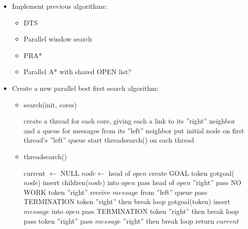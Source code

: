 \documentclass{article}
\begin{document}
\begin{itemize}


\item Implement previous algorithms:
  \begin{itemize}
  \item DTS
  \item Parallel window search
  \item PRA*
  \item Parallel A* with shared OPEN list?
  \end{itemize}

\item Create a new parallel best first search algorithm:\\
  \begin{itemize}
  \item search(init, cores)
  \begin{algorithmic}[1]
  \STATE create a thread for each core, giving each a link to its ''right'' neighbor and a queue for messages from its ''left'' neighbor
  \STATE put initial node on first thread's ''left'' queue
  \STATE start threadsearch() on each thread
  \end{algorithmic}

  \item threadsearch()
  \begin{algorithmic}[1]
  \STATE current $\leftarrow$ NULL
  \LOOP
      \STATE $node \leftarrow$ head of $open$
        \STATE create GOAL token
        \STATE gotgoal($node$)
      \ELSE
        \STATE insert children($node$) into $open$
      \ENDIF
    \ENDFOR
      \STATE pass head of $open$ ''right''
    \ELSE
      \STATE pass NO WORK token ''right''
    \ENDIF
    \STATE receive $message$ from ''left'' queue
        \STATE pass TERMINATION token ''right'' then break loop
      \ELSE
        \STATE gotgoal(token)
      \ENDIF
      \STATE insert $message$ into $open$
        \STATE pass TERMINATION token ''right'' then break loop
        \STATE pass token ''right''
      \ENDIF
      \STATE pass $message$ ''right'' then break loop
    \ENDIF
  \ENDLOOP
  \STATE return $current$
  \end{algorithmic}


\end{itemize}
\end{itemize}
\end{document}
